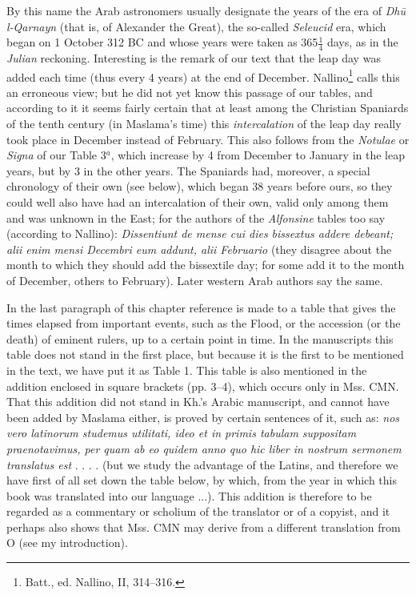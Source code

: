 \documentclass[11pt]{article}
\newcommand{\Pg}[1]{\marginpar{\footnotesize\color{gray}#1}}
\begin{document}
\par By this name the Arab astronomers usually designate the years of the era of \emph{Dhū l-Qarnayn} (that is, of Alexander the Great), the so-called \emph{Seleucid} era, which began on 1 October 312 BC and whose years were taken as 365$\tfrac{1}{4}$ days, as in the \emph{Julian} reckoning. Interesting is the remark of our text that the leap day was added each time (thus every 4 years) at the end of December. Nallino\footnote{Batt., ed. Nallino, II, 314–316.} calls this an erroneous view; but he did not yet know this passage of our tables, and according to it it seems fairly certain that at least among the Christian Spaniards of the tenth century (in Maslama's time) this \emph{intercalation} of the leap day really took place in December instead of February. This also follows from the \emph{Notulae} or \emph{Signa} of our Table 3$^{a}$, which increase by 4 from December to January in the leap years, but by 3 in the other years. The Spaniards had, moreover, a special chronology of their own (see below), which began 38 years before ours, so they could well also have had an intercalation of their own, valid only among them \Pg{35}and was unknown in the East; for the authors of the \emph{Alfonsine} tables too say (according to Nallino): \emph{Dissentiunt de mense cui dies bissextus addere debeant; alii enim mensi Decembri eum addunt, alii Februario} (they disagree about the month to which they should add the bissextile day; for some add it to the month of December, others to February). Later western Arab authors say the same.\par
\par In the last paragraph of this chapter reference is made to a table that gives the times elapsed from important events, such as the Flood, or the accession (or the death) of eminent rulers, up to a certain point in time. In the manuscripts this table does not stand in the first place, but because it is the first to be mentioned in the text, we have put it as Table 1. This table is also mentioned in the addition enclosed in square brackets (pp. 3–4), which occurs only in Mss. CMN. That this addition did not stand in Kh.'s Arabic manuscript, and cannot have been added by Maslama either, is proved by certain sentences of it, such as: \emph{nos vero latinorum studemus utilitati, ideo et in primis tabulam suppositam praenotavimus, per quam ab eo quidem anno quo hic liber in nostrum sermonem translatus est} . . . . (but we study the advantage of the Latins, and therefore we have first of all set down the table below, by which, from the year in which this book was translated into our language ...). This addition is therefore to be regarded as a commentary or scholium of the translator or of a copyist, and it perhaps also shows that Mss. CMN may derive from a different translation from O (see my introduction).\par
\end{document}
